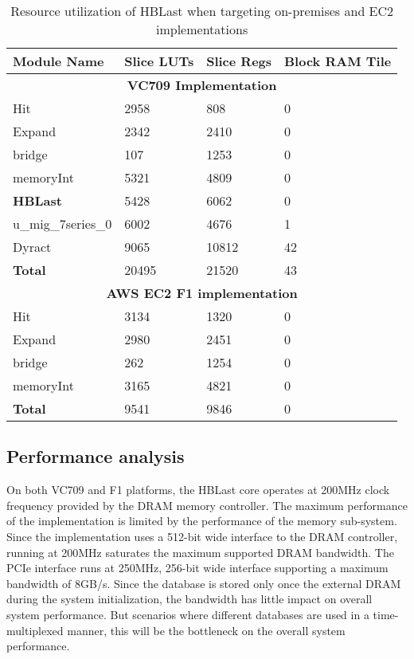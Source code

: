 \begin{table}[!t]
\caption {Resource utilization of HBLast when targeting on-premises and EC2 implementations} \label{tab:util}
\begin{tabular}{l|l|l|l}
\toprule
Module Name        & Slice LUTs & Slice Regs & Block RAM Tile \\
\midrule
\multicolumn{4}{c}{\bf VC709 Implementation}\\
\midrule
Hit                & 2958       & 808        & 0              \\
Expand             & 2342       & 2410       & 0              \\
bridge             & 107        & 1253       & 0              \\
memoryInt          & 5321       & 4809       & 0              \\
\midrule
{\bf HBLast}       & 5428      & 6062        & 0              \\
u\_mig\_7series\_0 & 6002      & 4676        & 1              \\ 
Dyract             & 9065      & 10812       & 42             \\
\midrule
{\bf Total}        & 20495     & 21520       & 43             \\
\midrule
\multicolumn{4}{c}{\bf AWS EC2 F1 implementation}\\
\midrule
Hit                & 3134      & 1320       & 0               \\
Expand             & 2980      & 2451       & 0               \\
bridge             & 262       & 1254       & 0               \\
memoryInt          & 3165      & 4821       & 0               \\
\midrule
{\bf Total}        & 9541      & 9846       & 0               \\
\bottomrule
\end{tabular}
\label{tab:util}
\end{table}


\subsection{Performance analysis}

On both VC709 and F1 platforms, the HBLast core operates at 200MHz clock frequency provided by the DRAM memory controller.
The maximum performance of the implementation is limited by the performance of the memory sub-system. 
Since the implementation uses a 512-bit wide interface to the DRAM controller, running at 200MHz saturates the maximum supported DRAM bandwidth.
The PCIe interface runs at 250MHz, 256-bit wide interface supporting a maximum bandwidth of 8GB/s.
Since the database is stored only once the external DRAM during the system initialization, the bandwidth has little impact on overall system performance.
But scenarios where different databases are used in a time-multiplexed manner, this will be the bottleneck on the overall system performance.

